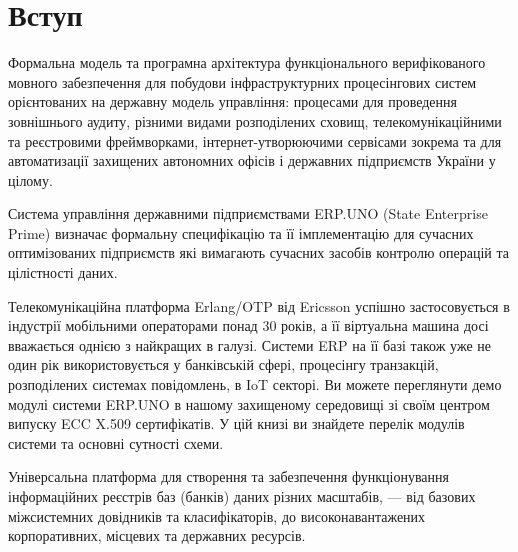 \chapter{Вступ}

Формальна модель та програмна архітектура
функціонального верифікованого мовного забезпечення
для побудови інфраструктурних процесінгових систем
орієнтованих на державну модель управління:
процесами для проведення зовнішнього аудиту,
різними видами розподілених сховищ,
телекомунікаційними та реєстровими фреймворками,
інтернет-утворюючими сервісами зокрема та для
автоматизації захищених автономних офісів і
державних підприємств України у цілому.

Система управління державними підприємствами ERP.UNO (State Enterprise Prime) визначає формальну
специфікацію та її імплементацію для сучасних оптимізованих підприємств
які вимагають сучасних засобів контролю операцій та цілістності даних.


Телекомунікаційна платформа Erlang/OTP від Ericsson успішно застосовується
в індустрії мобільними операторами понад 30 років, а її віртуальна машина
досі вважається однією з найкращих в галузі. Системи ERP на її базі також
уже не один рік використовується у банківській сфері, процесінгу транзакцій,
розподілених системах повідомлень, в IoT секторі. Ви можете переглянути демо
модулі системи ERP.UNO в нашому захищеному середовищі зі своїм центром
випуску ECC X.509 сертифікатів. У цій книзі ви знайдете перелік модулів
системи та основні сутності схеми.

Універсальна платформа для створення та забезпечення функціонування
інформаційних реєстрів баз (банків) даних різних масштабів, — від базових
міжсистемних довідників та класифікаторів, до високонавантажених корпоративних,
місцевих та державних ресурсів.
